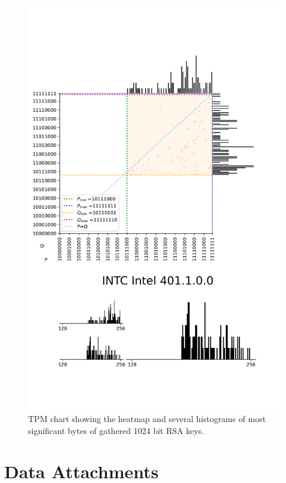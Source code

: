 \begin{figure}[H]
    \centering
    \includegraphics[width=\textwidth,height=\textheight-1.5cm, keepaspectratio]{img/visualizations/rsa.png}
    \caption{TPM chart showing the heatmap and several histograms of most significant bytes of gathered 1024 bit RSA keys.}
    \label{fig:dev-profiles-diagram}
\end{figure}





\renewcommand{\thechapter}{C}
\chapter{Data Attachments}